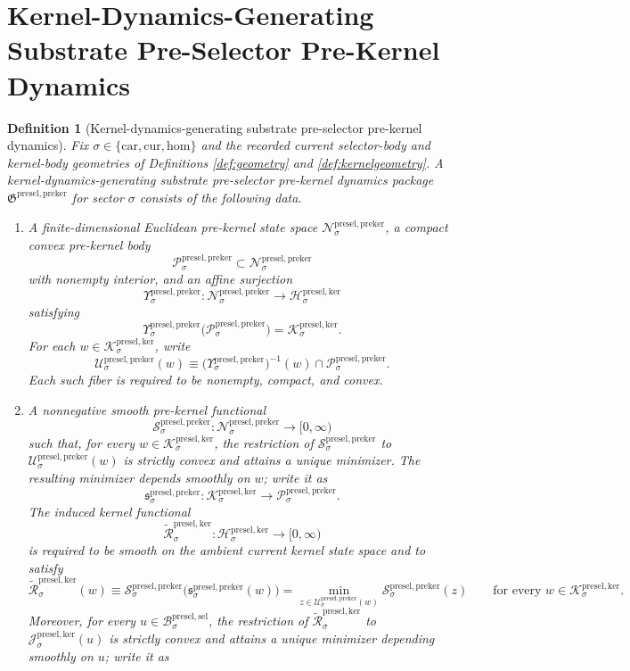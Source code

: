 \documentclass[11pt]{article}
\newcommand{\Car}{\mathrm{car}}
\newcommand{\Cur}{\mathrm{cur}}
\newcommand{\Hom}{\mathrm{hom}}
\newcommand{\PreSectionSelectorBody}[1]{\mathcal B_{#1}^{\mathrm{presel,sel}}}
\newcommand{\KernelSpace}[1]{\mathcal H_{#1}^{\mathrm{presel,ker}}}
\newcommand{\KernelBody}[1]{\mathcal K_{#1}^{\mathrm{presel,ker}}}
\newcommand{\KernelFiber}[2]{\mathcal J_{#1}^{\mathrm{presel,ker}}(#2)}
\newcommand{\PreKernelPackage}{\mathfrak G^{\mathrm{presel,preker}}}
\newcommand{\PreKernelSpace}[1]{\mathcal N_{#1}^{\mathrm{presel,preker}}}
\newcommand{\PreKernelBody}[1]{\mathcal P_{#1}^{\mathrm{presel,preker}}}
\newcommand{\PreKernelProj}[1]{\Upsilon_{#1}^{\mathrm{presel,preker}}}
\newcommand{\PreKernelFiber}[2]{\mathcal U_{#1}^{\mathrm{presel,preker}}(#2)}
\newcommand{\PreKernelFunctional}[1]{\mathscr S_{#1}^{\mathrm{presel,preker}}}
\newcommand{\PreKernelMinLift}[1]{\mathfrak s_{#1}^{\mathrm{presel,preker}}}
\newcommand{\InducedKernelFunctional}[1]{\widetilde{\mathscr R}_{#1}^{\mathrm{presel,ker}}}
\newtheorem{definition}{Definition}
\begin{document}
\section{Kernel-Dynamics-Generating Substrate Pre-Selector Pre-Kernel Dynamics}

\begin{definition}[Kernel-dynamics-generating substrate pre-selector pre-kernel dynamics]
\label{def:prekernel}
Fix \(\sigma\in\{\Car,\Cur,\Hom\}\) and the recorded current selector-body and kernel-body geometries of Definitions \ref{def:geometry} and \ref{def:kernelgeometry}. A \emph{kernel-dynamics-generating substrate pre-selector pre-kernel dynamics package} \(\PreKernelPackage\) for sector \(\sigma\) consists of the following data.
\begin{enumerate}
    \item A finite-dimensional Euclidean pre-kernel state space \(\PreKernelSpace{\sigma}\), a compact convex pre-kernel body
    \[
    \PreKernelBody{\sigma}\subset\PreKernelSpace{\sigma}
    \]
    with nonempty interior, and an affine surjection
    \[
    \PreKernelProj{\sigma}:\PreKernelSpace{\sigma}\to\KernelSpace{\sigma}
    \]
    satisfying
    \[
    \PreKernelProj{\sigma}\bigl(\PreKernelBody{\sigma}\bigr)
    =
    \KernelBody{\sigma}.
    \]
    For each \(w\in\KernelBody{\sigma}\), write
    \[
    \PreKernelFiber{\sigma}{w}
    \equiv
    \bigl(\PreKernelProj{\sigma}\bigr)^{-1}(w)\cap\PreKernelBody{\sigma}.
    \]
    Each such fiber is required to be nonempty, compact, and convex.
    \item A nonnegative smooth pre-kernel functional
    \[
    \PreKernelFunctional{\sigma}:\PreKernelSpace{\sigma}\to[0,\infty)
    \]
    such that, for every \(w\in\KernelBody{\sigma}\), the restriction of \(\PreKernelFunctional{\sigma}\) to \(\PreKernelFiber{\sigma}{w}\) is strictly convex and attains a unique minimizer. The resulting minimizer depends smoothly on \(w\); write it as
    \[
    \PreKernelMinLift{\sigma}:\KernelBody{\sigma}\to\PreKernelBody{\sigma}.
    \]
    The induced kernel functional
    \[
    \InducedKernelFunctional{\sigma}:\KernelSpace{\sigma}\to[0,\infty)
    \]
    is required to be smooth on the ambient current kernel state space and to satisfy
    \[
    \InducedKernelFunctional{\sigma}(w)
    \equiv
    \PreKernelFunctional{\sigma}\bigl(\PreKernelMinLift{\sigma}(w)\bigr)
    =
    \min_{z\in\PreKernelFiber{\sigma}{w}}
    \PreKernelFunctional{\sigma}(z)
    \qquad
    \text{for every }
    w\in\KernelBody{\sigma}.
    \]
    Moreover, for every \(u\in\PreSectionSelectorBody{\sigma}\), the restriction of \(\InducedKernelFunctional{\sigma}\) to \(\KernelFiber{\sigma}{u}\) is strictly convex and attains a unique minimizer depending smoothly on \(u\); write it as

\end{enumerate}
\end{definition}
\end{document}
